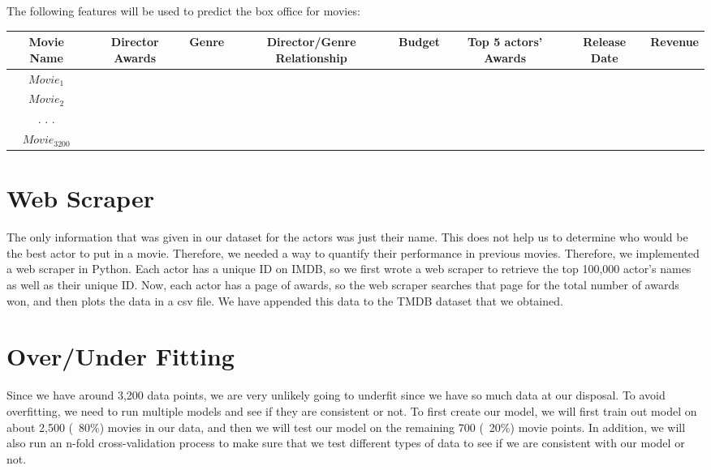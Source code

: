 \documentclass{article}
\begin{document}
    The following features will be used to predict the box office for movies: 

    \begin{table}[h!]

    \hspace*{-4.5cm}\begin{tabu} to \textwidth { |c|c|c|c|c|c|c|c| }
    \hline
     Movie Name & Director Awards & Genre & Director/Genre Relationship & Budget & Top 5 actors' Awards & Release Date & Revenue \\ 
     \hline
     $Movie_1$  & & & & & & & \\ 
     \hline
     $Movie_2$  & & & & & & & \\
     \hline
     . . .  & & & & & & & \\
     \hline
     $Movie_{3200}$ & & & & & & & \\
     \hline
    \end{tabu} 
    \end{table}
    
\section{Web Scraper}

    The only information that was given in our dataset for the actors was just their name. This does not help us to determine who would be the best actor to put in a movie. Therefore, we needed a way to quantify their performance in previous movies. Therefore, we implemented a web scraper in Python. Each actor has a unique ID on IMDB, so we first wrote a web scraper to retrieve the top 100,000 actor’s names as well as their unique ID. Now, each actor has a page of awards, so the web scraper searches that page for the total number of awards won, and then plots the data in a csv file. We have appended this data to the TMDB dataset that we obtained. 

\section{Over/Under Fitting}

Since we have around 3,200 data points, we are very unlikely going to underfit since we have so much data at our disposal. To avoid overfitting, we need to run multiple models and see if they are consistent or not. To first create our model, we will first train out model on about 2,500 (~80\%) movies in our data, and then we will test our model on the remaining 700 (~20\%) movie points. In addition, we will also run an n-fold cross-validation process to make sure that we test different types of data to see if we are consistent with our model or not. 
\end{document}

